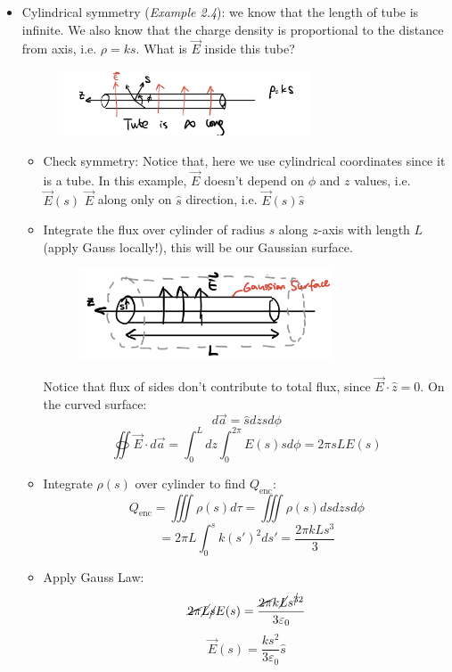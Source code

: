 \documentclass[12pt,a4paper,twoside]{article}
\begin{document}
\begin{itemize}
        \item Cylindrical symmetry (\textit{Example 2.4}): we know that the length of tube is infinite. We also know that the charge density is proportional to the distance from axis, i.e. $\rho =ks$. What is $\overrightarrow{E}$ inside this tube?
        \begin{figure}[ht]
            \centering
            \includegraphics[width=7.5cm]{250-Revision/gauss-cylinder.png}
        \end{figure}
            \begin{itemize}
                \item Check symmetry:
                    \subitem Notice that, here we use cylindrical coordinates since it is a tube. In this example, $\overrightarrow{E}$ doesn't depend on $\phi$ and $z$ values, i.e. $\overrightarrow{E}(s)$
                    \subitem $\overrightarrow{E}$ along only on $\hat{s}$ direction, i.e. $\overrightarrow{E}(s)\hat{s}$
                \item Integrate the flux over cylinder of radius $s$ along $z$-axis with length $L$ (apply Gauss locally!), this will be our Gaussian surface.
                \begin{figure}[ht]
                    \centering
                    \includegraphics[width=7.5cm]{250-Revision/tube-gaussian-surface.png}
                \end{figure}
                    \subitem Notice that flux of sides don't contribute to total flux, since $\overrightarrow{E}\cdot \hat{z}=0$.
                    \subitem On the curved surface:
                    \[d\overrightarrow{a}=\hat{s}dzsd\phi\]
                    \[\oiint \overrightarrow{E}\cdot d\overrightarrow{a}=\int_{0}^{L}dz\int_{0}^{2\pi}E(s) sd\phi=2\pi sLE(s)\]
                \item Integrate $\rho(s)$ over cylinder to find $Q_{\mathrm{enc}}$:
                    \[Q_{\mathrm{enc}}=\iiint \rho(s)d\tau=\iiint \rho(s)dsdzsd\phi\]
                    \[=2\pi L\int_{0}^{s}k(s')^2ds'=\frac{2\pi kLs^3}{3}\]
                \item Apply Gauss Law:
                    \[\cancel{2\pi}\cancel{L}\cancel{s}E(s)=\frac{\cancel{2\pi} k\cancel{L}s^{\cancel{3}2}}{3\varepsilon_0}\]
                    \[\overrightarrow{E}(s)=\frac{ks^2}{3\varepsilon_0}\hat{s}\]
            \end{itemize}
            

\end{itemize}
\end{document}
